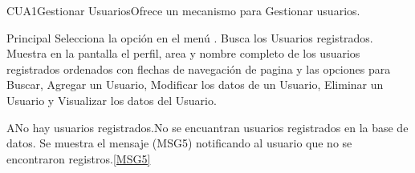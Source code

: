 

\begin{UseCase}{CUA1}{Gestionar Usuarios}{Ofrece un mecanismo para Gestionar usuarios.}
	\end{UseCase}
	
	
	
	
	
	\begin{UCtrayectoria}{Principal}
		\UCpaso[\UCactor] Selecciona la opción  en el menú .
		\UCpaso Busca los Usuarios registrados.\label{Paso:CUA1BuscaUsuarios}
		\UCpaso Muestra en la pantalla el perfil, area y nombre completo de los usuarios registrados ordenados con flechas de navegación de pagina y las opciones para Buscar, Agregar un Usuario, Modificar los datos de un Usuario, Eliminar un Usuario y Visualizar los datos del Usuario.     %
	\end{UCtrayectoria}

	\begin{UCtrayectoriaA}{A}{No hay usuarios registrados.}{No se encuantran usuarios registrados en la base de datos.}
			\UCpaso Se muestra el mensaje (MSG5) notificando al usuario que no se encontraron registros.\ref{MSG5}
	\end{UCtrayectoriaA}

